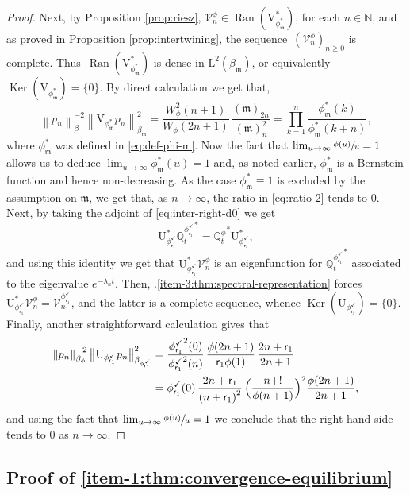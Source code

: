 \documentclass[10pt]{amsart}
\theoremstyle{plain}
\theoremstyle{definition}
\newcommand{\norm}[1]{\left\lVert#1\right\rVert}
\newcommand{\bnorm}[1]{\bigl\lVert#1\bigr\rVert}
\DeclareMathOperator{\Ran}{Ran}
\DeclareMathOperator{\Ker}{Ker}
\newcommand{\N}{\mathbb{N}}
\newcommand{\V}{\mathcal{V}}
\newcommand{\J}{\mathds{Q}}
\newcommand{\Leb}{\mathrm{L}}
\newcommand{\m}{\mathfrak{m}}
\newcommand{\lam}{{\bm{\lambda}_1}}
\newcommand{\vat}{{\mathsf{r}_1}}
\newcommand{\phm}{{\phi_\m^*}}
\renewcommand{\varphi}{{\phi_{\vat}^{\checkmark}}}
\newcommand{\gab}[1][\lam,\mo]{{\beta_{#1}}}
\let\mo\mu
\let\bpsi\beta
\begin{document}
\begin{proof}
Next, by Proposition \ref{prop:riesz}, \hbox{$\V_n^\phi \in \Ran(\mathrm{V}_{\phm}^*)$}, for each $n \in \N$, and as proved in Proposition \ref{prop:intertwining}, the sequence~$(\V_n^\phi)_{n \geq 0}$ is complete. Thus~$\Ran(\mathrm{V}_{\phm}^*)$ is dense in $\Leb^2(\gab[\m])$, or equivalently $\Ker(\mathrm{V}_{\phm}) = \{0\}$. By direct calculation we get that,
\begin{equation}
\label{eq:ratio-2}
\norm{p_n}_{\bpsi}^{-2} \norm{\mathrm{V}_{\phm} p_n}_{\gab[\m]}^2 = \frac{W_\phi^2(n+1)}{W_\phi(2n+1)}\, \frac{(\m)_{2n}}{(\m)_n^2} = \prod_{k=1}^n \frac{\phm(k)}{\phm(k+n)},
\end{equation}
where $\phm$ was defined in \eqref{eq:def-phi-m}. Now the fact that $\lim_{u \to \infty} \sfrac{\phi(u)}{u} = 1$ allows us to deduce $\lim_{u \to \infty} \phm(u) = 1$ and, as noted earlier, $\phm$ is a Bernstein function and hence non-decreasing. As the case $\phm \equiv 1$ is excluded by the assumption on $\m$, we get that, as $n \to \infty$, the ratio in \eqref{eq:ratio-2} tends to 0. Next, by taking the adjoint of \eqref{eq:inter-right-d0} we get
\begin{equation*}
\mathrm{U}_\varphi^* {\J_t^\varphi}^* = {\J_t^\phi}^* \mathrm{U}_\varphi^*,
\end{equation*}
and using this identity we get that $\mathrm{U}_\varphi^* \V_n^\phi$ is an eigenfunction for ${\J_t^\varphi}^*$ associated to the eigenvalue $e^{-\lambda_n t}$. Then, .\eqref{item-3:thm:spectral-representation} forces $\mathrm{U}_\varphi^* \V_n^\phi = \V_n^\varphi$, and the latter is a complete sequence, whence $\Ker(\mathrm{U}_\varphi) = \{0\}$. Finally, another straightforward calculation gives that
\begin{align*}
\norm{p_n}_{\bpsi_\phi}^{-2} \bnorm{\mathrm{U}_{\varphi} p_n}_{\bpsi_\varphi}^2 &= \frac{\varphi^2(0)}{\varphi^2(n)}\, \frac{\phi(2n+1)}{\vat \phi(1)}\, \frac{2n+\vat}{2n+1}\\
&= \varphi(0)\, \frac{2n+\vat}{\left(n+\vat\right)^2}\, \Bigl(\frac{n+!}{\phi(n+1)}\Bigr)^2 \frac{\phi(2n+1)}{2n+1},
\end{align*}
and using the fact that $\lim_{u \to \infty} \sfrac{\phi(u)}{u} = 1$ we conclude that the right-hand side tends to 0 as $n \to \infty$.
\end{proof}

\subsection{Proof of \eqref{item-1:thm:convergence-equilibrium}}
\end{document}
